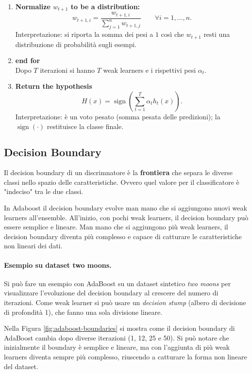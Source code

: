 \begin{enumerate}
\item \textbf{Normalize $w_{t+1}$ to be a distribution:}\\
\[
w_{t+1,i}=\frac{w_{t+1,i}}{\sum_{j=1}^{n} w_{t+1,j}}\qquad \forall i=1,\ldots,n.
\]
Interpretazione: si riporta la somma dei pesi a $1$ così che $w_{t+1}$ resti una distribuzione di probabilità sugli esempi.

\item \textbf{end for}\\
Dopo $T$ iterazioni si hanno $T$ weak learners e i rispettivi pesi $\alpha_t$.
\item \textbf{Return the hypothesis}\\
\[
H(x)=\operatorname{sign}\left(\sum_{t=1}^{T}\alpha_t h_t(x)\right).
\]
Interpretazione: è un voto pesato (somma pesata delle predizioni); la $\operatorname{sign}(\cdot)$ restituisce la classe finale.
\end{enumerate}

\subsection{Decision Boundary}
Il decision boundary di un discrimnatore è la \textbf{frontiera} che separa le diverse classi nello spazio delle caratteristiche. Ovvero quel valore per il classificatore è "indeciso" tra le due classi.

In Adaboost il decision boundary evolve man mano che si aggiungono nuovi weak learners all'ensemble. All'inizio, con pochi weak learners, il decision boundary può essere semplice e lineare. Man mano che si aggiungono più weak learners, il decision boundary diventa più complesso e capace di catturare le caratteristiche non lineari dei dati.

\paragraph{Esempio su dataset two moons.}
Si può fare un esempio con AdaBoost su un dataset sintetico \emph{two moons} per visualizzare l'evoluzione del decision boundary al crescere del numero di iterazioni. Come weak learner si può usare un \emph{decision stump} (albero di decisione di profondità 1), che fanno una sola divisione lineare.

Nella Figura \ref{fig:adaboost-boundaries} si mostra come il decision boundary di AdaBoost cambia dopo diverse iterazioni (1, 12, 25 e 50). Si può notare che inizialmente il boundary è semplice e lineare, ma con l'aggiunta di più weak learners diventa sempre più complesso, riuscendo a catturare la forma non lineare del dataset.

